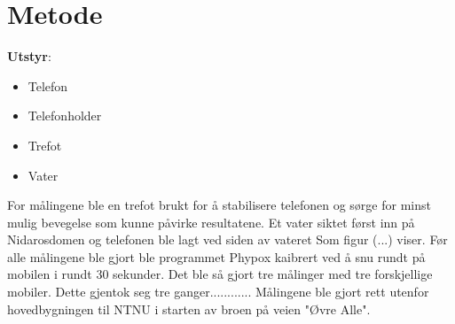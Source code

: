 \section{Metode}
\noindent\textbf{Utstyr}:
\begin{itemize}
    \item Telefon
    \item Telefonholder
    \item Trefot
    \item Vater
\end{itemize}
  
For målingene ble en trefot brukt for å stabilisere telefonen og sørge for minst mulig bevegelse som kunne påvirke resultatene. Et vater siktet først inn på Nidarosdomen og telefonen ble lagt ved siden av vateret Som figur (...) viser. Før alle målingene ble gjort ble programmet Phypox kaibrert ved å snu rundt på mobilen i rundt 30 sekunder. Det ble så gjort tre målinger med tre forskjellige mobiler. Dette gjentok seg tre ganger............
Målingene ble gjort rett utenfor hovedbygningen til NTNU i starten av broen på veien "Øvre Alle". 

